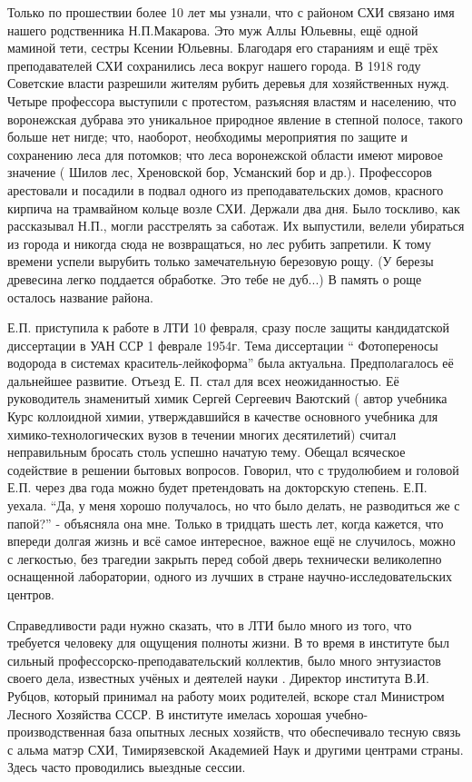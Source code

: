 Только по прошествии более 10 лет мы узнали, что с районом СХИ связано имя нашего родственника Н.П.Макарова. Это муж Аллы Юльевны, ещё одной маминой тети, сестры Ксении Юльевны. Благодаря его стараниям и ещё трёх преподавателей СХИ  сохранились леса вокруг нашего города. В 1918 году Советские власти разрешили жителям рубить деревья для хозяйственных нужд. Четыре профессора выступили с протестом, разъясняя властям и населению, что воронежская дубрава это уникальное природное явление в степной полосе, такого больше нет нигде; что, наоборот, необходимы мероприятия по защите и сохранению леса для потомков; что леса воронежской области имеют мировое значение ( Шилов лес, Хреновской бор, Усманский бор и др.). Профессоров арестовали и посадили в подвал одного из преподавательских домов, красного кирпича на трамвайном кольце возле СХИ. Держали два дня. Было тоскливо, как рассказывал Н.П., могли расстрелять за саботаж. Их выпустили, велели убираться из города и никогда сюда не возвращаться, но лес рубить запретили. К тому времени успели вырубить только замечательную березовую рощу. (У березы древесина легко поддается обработке. Это тебе не дуб...) В память о роще осталось название района.

Е.П. приступила к работе в ЛТИ 10 февраля, сразу после защиты кандидатской диссертации в УАН ССР 1 феврале 1954г. Тема диссертации “ Фотопереносы водорода в системах краситель-лейкоформа” была актуальна. Предполагалось её дальнейшее развитие. Отъезд Е. П. стал для всех неожиданностью. Её руководитель знаменитый химик Сергей Сергеевич Ваютский ( автор учебника Курс коллоидной химии, утверждавшийся в качестве основного учебника для химико-технологических вузов в течении многих десятилетий) считал неправильным бросать столь успешно начатую тему. Обещал всяческое содействие в решении бытовых вопросов. Говорил, что с трудолюбием и головой Е.П. через два года можно будет претендовать на докторскую степень. Е.П. уехала. “Да, у меня хорошо получалось, но что было делать, не разводиться же с папой?” - объясняла она мне. Только в тридцать шесть лет, когда кажется, что впереди долгая жизнь и всё самое интересное, важное ещё не случилось, можно с легкостью, без трагедии закрыть перед собой дверь технически великолепно оснащенной лаборатории, одного из лучших в стране научно-исследовательских центров.

Справедливости ради нужно сказать, что в ЛТИ было много из того, что требуется человеку для ощущения полноты жизни. В то время в институте был сильный профессорско-преподавательский коллектив, было много энтузиастов своего дела, известных учёных и деятелей науки . Директор института В.И. Рубцов, который принимал на работу моих родителей, вскоре стал Министром Лесного Хозяйства СССР. В институте имелась хорошая учебно-производственная база опытных лесных хозяйств, что обеспечивало тесную связь с альма матэр СХИ, Тимирязевской Академией Наук и другими центрами страны. Здесь часто проводились выездные сессии.

